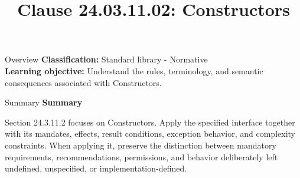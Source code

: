 \documentclass[10pt,letterpaper]{article}
\title{Clause 24.03.11.02: Constructors}
\author{}
\date{}
\begin{document}
\maketitle
\begin{CornellOverviewBox}{Overview}
\textbf{Classification:} Standard library - Normative\\[2pt]
\textbf{Learning objective:} Understand the rules, terminology, and semantic consequences associated with Constructors.
\end{CornellOverviewBox}\begin{CornellSummaryBox}{Summary}
{\sffamily\bfseries\color{Accent} Summary}\par\vspace{3pt}Section 24.3.11.2 focuses on Constructors. Apply the specified interface together with its mandates, effects, result conditions, exception behavior, and complexity constraints. When applying it, preserve the distinction between mandatory requirements, recommendations, permissions, and behavior deliberately left undefined, unspecified, or implementation-defined.
\end{CornellSummaryBox}
\end{document}
